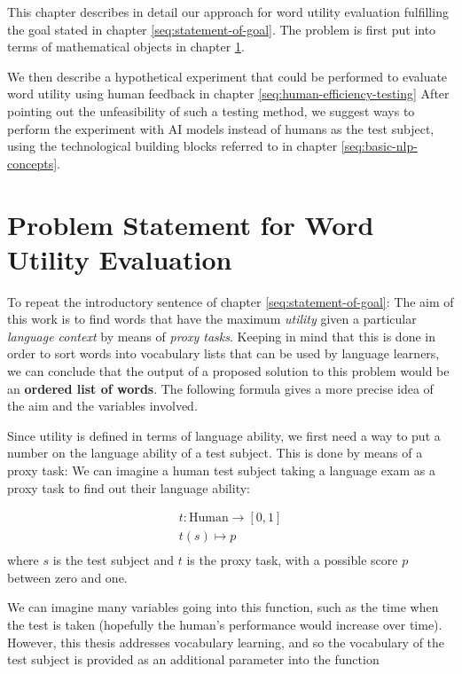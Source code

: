 This chapter describes in detail our approach for word utility evaluation fulfilling the goal stated in chapter \ref{seq:statement-of-goal}.
The problem is first put into terms of mathematical objects in chapter \ref{seq:problem-statement-formal}.

We then describe a hypothetical experiment that could be performed to evaluate word utility using human feedback in chapter \ref{seq:human-efficiency-testing}
After pointing out the unfeasibility of such a testing method, we suggest ways to perform the experiment with AI models instead of humans as the test subject, using the technological building blocks referred to in chapter \ref{seq:basic-nlp-concepts}.

\section{Problem Statement for Word Utility Evaluation} \label{seq:problem-statement-formal}


To repeat the introductory sentence of chapter \ref{seq:statement-of-goal}:
The aim of this work is to find words that have the maximum \textit{utility} given a particular \textit{language context} by means of \textit{proxy tasks}.
Keeping in mind that this is done in order to sort words into vocabulary lists that can be used by language learners, we can conclude that the output of a proposed solution to this problem would be an \textbf{ordered list of words}. The following formula gives a more precise idea of the aim and the variables involved.

Since utility is defined in terms of language ability, we first need a way to put a number on the language ability of a test subject. This is done by means of a proxy task: We can imagine a human test subject taking a language exam as a proxy task to find out their language ability:

\begin{align*}
	t: \text{Human} \to [0, 1] \\
	t (s) \mapsto p            \\
\end{align*}
where $s$ is the test subject and $t$ is the proxy task, with a possible score $p$ between zero and one.

We can imagine many variables going into this function, such as the time when the test is taken (hopefully the human's performance would increase over time). However, this thesis addresses vocabulary learning, and so the vocabulary of the test subject is provided as an additional parameter into the function


